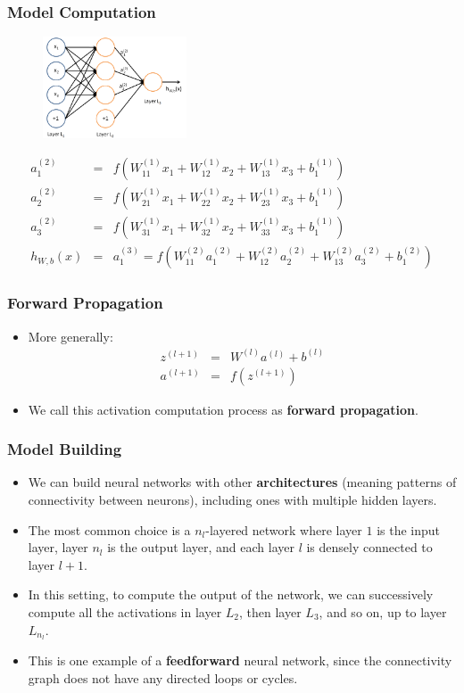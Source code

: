 \documentclass{beamer}
\newcommand{\beqn}[1]{\vspace{-0.03in}\begin{eqnarray}#1\end{eqnarray}\vspace{-0.03in}}
\begin{document}
\begin{frame}
\frametitle{Model Computation}
\begin{figure}
      \includegraphics[height=3cm]{figs/Network331.png}
\end{figure}
\beqn{
a_1^{(2)} &=& f(W_{11}^{(1)}x_1+W_{12}^{(1)}x_2+W_{13}^{(1)}x_3+b_1^{(1)})\\
a_2^{(2)} &=& f(W_{21}^{(1)}x_1+W_{22}^{(1)}x_2+W_{23}^{(1)}x_3+b_1^{(1)})\\
a_3^{(2)} &=& f(W_{31}^{(1)}x_1+W_{32}^{(1)}x_2+W_{33}^{(1)}x_3+b_1^{(1)})\\
h_{W,b}(x) &=& a_1^{(3)}=f(W_{11}^{(2)}a_1^{(2)}+W_{12}^{(2)}a_2^{(2)}+W_{13}^{(2)}a_3^{(2)}+b_1^{(2)})
}
\end{frame}

\begin{frame}
\frametitle{Forward Propagation}
\begin{itemize}
\item More generally:
\beqn{
z^{(l+1)}&=& W^{(l)}a^{(l)}+b^{(l)} \\
a^{(l+1)}&=& f(z^{(l+1)})
}
\item We call this activation computation process as \textbf{forward propagation}.
\end{itemize}
\end{frame}

\begin{frame}
\frametitle{Model Building}
\begin{itemize}
\item We can build neural networks with other \textbf{architectures} (meaning patterns of connectivity between neurons), including ones with multiple hidden layers.
\item The most common choice is a $n_l$-layered network where layer $1$ is the input layer, layer $n_l$ is the output layer, and each layer $l$ is densely connected to layer $l+1$.
\item In this setting, to compute the output of the network, we can successively compute all the activations in layer $L_2$, then layer $L_3$, and so on, up to layer $L_{n_l}$.
\item This is one example of a \textbf{feedforward} neural network, since the connectivity graph does not have any directed loops or cycles. 
\end{itemize}
\end{frame}
\end{document}
